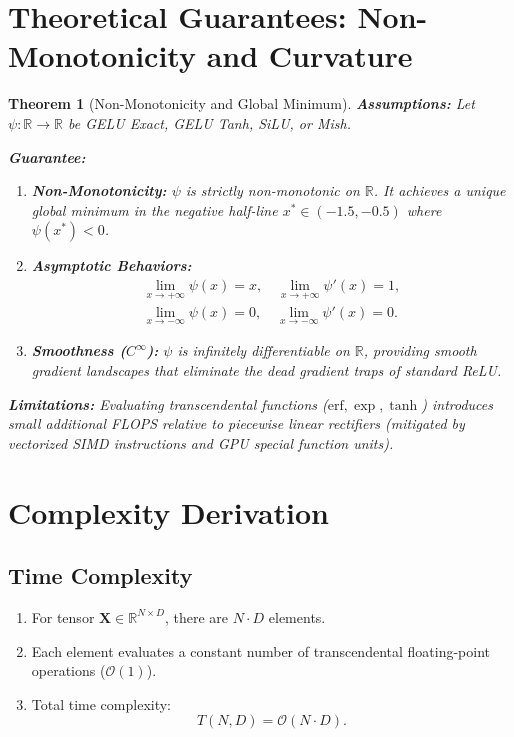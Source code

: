 \documentclass[11pt]{article}
\newtheorem{theorem}{Theorem}
\begin{document}
\section{Theoretical Guarantees: Non-Monotonicity and Curvature}
\label{sec:correctness}

\begin{theorem}[Non-Monotonicity and Global Minimum]
\label{thm:smooth_min}
\textbf{Assumptions:}
Let $\psi: \mathbb{R} \to \mathbb{R}$ be GELU Exact, GELU Tanh, SiLU, or Mish.

\textbf{Guarantee:}
\begin{enumerate}
    \item \textbf{Non-Monotonicity:} $\psi$ is strictly non-monotonic on $\mathbb{R}$. It achieves a unique global minimum in the negative half-line $x^* \in (-1.5, -0.5)$ where $\psi(x^*) < 0$.
    \item \textbf{Asymptotic Behaviors:}
    \begin{align}
    \lim_{x \to +\infty} \psi(x) = x, \quad \lim_{x \to +\infty} \psi'(x) = 1, \\
    \lim_{x \to -\infty} \psi(x) = 0, \quad \lim_{x \to -\infty} \psi'(x) = 0.
    \end{align}
    \item \textbf{Smoothness ($C^\infty$):} $\psi$ is infinitely differentiable on $\mathbb{R}$, providing smooth gradient landscapes that eliminate the dead gradient traps of standard ReLU.
\end{enumerate}

\textbf{Limitations:}
Evaluating transcendental functions ($\text{erf}, \exp, \tanh$) introduces small additional FLOPS relative to piecewise linear rectifiers (mitigated by vectorized SIMD instructions and GPU special function units).
\end{theorem}

\section{Complexity Derivation}
\label{sec:complexity}

\subsection{Time Complexity}
\begin{enumerate}
    \item For tensor $\mathbf{X} \in \mathbb{R}^{N \times D}$, there are $N \cdot D$ elements.
    \item Each element evaluates a constant number of transcendental floating-point operations ($\mathcal{O}(1)$).
    \item Total time complexity:
    \begin{equation}
    T(N, D) = \mathcal{O}(N \cdot D).
    \end{equation}
\end{enumerate}
\end{document}
